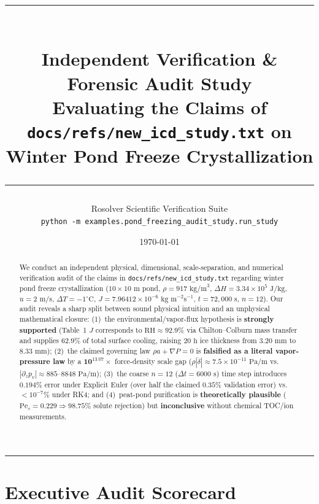 \documentclass[11pt,a4paper]{article}
\title{
  {\color{navy}\rule{\textwidth}{1.8pt}}\\[0.6em]
  {\LARGE\bfseries\color{navy} Independent Verification \& Forensic Audit Study}\\[0.35em]
  {\large\color{slate} Evaluating the Claims of \texttt{docs/refs/new\_icd\_study.txt} on Winter Pond Freeze Crystallization}\\[0.4em]
  {\color{navy}\rule{\textwidth}{0.8pt}}
}
\author{Rosolver Scientific Verification Suite\\[2pt]{\small\texttt{python -m examples.pond\_freezing\_audit\_study.run\_study}}}
\date{\today}
\begin{document}
\maketitle

\begin{abstract}
\noindent We conduct an independent physical, dimensional, scale-separation, and numerical verification audit of the claims in \texttt{docs/refs/new\_icd\_study.txt} regarding winter pond freeze crystallization ($10\times 10\text{ m}$ pond, $\rho = 917\text{ kg/m}^3$, $\Delta H = 3.34\times 10^5\text{ J/kg}$, $u = 2\text{ m/s}$, $\Delta T = -1^\circ\text{C}$, $J = 7.96412\times 10^{-6}\text{ kg m}^{-2}\text{s}^{-1}$, $t = 72{,}000\text{ s}$, $n = 12$). Our audit reveals a sharp split between sound physical intuition and an unphysical mathematical closure: (1)~the environmental/vapor-flux hypothesis is \textbf{strongly supported} (Table~1 $J$ corresponds to $\mathrm{RH} \approx 92.9\%$ via Chilton--Colburn mass transfer and supplies $62.9\%$ of total surface cooling, raising $20\text{ h}$ ice thickness from $3.20\text{ mm}$ to $8.33\text{ mm}$); (2)~the claimed governing law $\rho a + \nabla P = 0$ is \textbf{falsified as a literal vapor-pressure law} by a $\mathbf{10^{13.07}\times}$ force-density scale gap ($\rho|\ddot{\delta}| \approx 7.5\times 10^{-11}\text{ Pa/m}$ vs.\ $|\partial_z p_v| \approx 885\text{--}8848\text{ Pa/m}$); (3)~the coarse $n = 12$ ($\Delta t = 6000\text{ s}$) time step introduces $0.194\%$ error under Explicit Euler (over half the claimed $0.35\%$ validation error) vs.\ $<10^{-7}\%$ under RK4; and (4)~peat-pond purification is \textbf{theoretically plausible} ($\mathrm{Pe}_s = 0.229 \Rightarrow 98.75\%$ solute rejection) but \textbf{inconclusive} without chemical TOC/ion measurements.
\end{abstract}

\tableofcontents
\vspace{0.8em}
\hrule
\vspace{1em}

\section{Executive Audit Scorecard}
\end{document}
